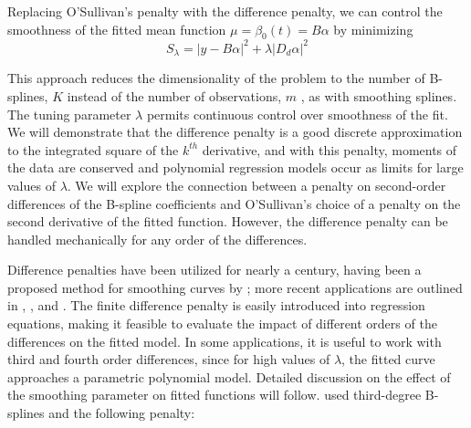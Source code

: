 \documentclass[12pt]{article}
\theoremstyle{definition}
\begin{document}
Replacing O'Sullivan's penalty with the difference penalty, we can control the smoothness of the fitted mean function $\mu = \beta_0\left( t \right) = B\alpha$ by minimizing
\begin{equation*} 
S_\lambda = \vert y- B \alpha \vert^2 + \lambda\vert D_d\alpha \vert^2
\end{equation*}

This approach reduces the dimensionality of the problem to the number of B-splines, $K$ instead of the number of observations, $m$ , as with smoothing splines. The tuning parameter $\lambda$ permits continuous control over smoothness of the fit. We will demonstrate that the difference penalty is a good discrete approximation to the integrated square of the $k^{th}$ derivative, and with this penalty, moments of the data are conserved and polynomial regression models occur as limits for large values of $\lambda$. We will explore the connection between a penalty on second-order differences of the B-spline coefficients and O'Sullivan's choice of a penalty on the second derivative of the fitted function. However, the difference penalty can be handled mechanically for any order of the differences.

Difference penalties have been utilized for nearly a century, having been a proposed method for smoothing curves by \cite{whittaker1922new}; more recent applications are outlined in  \cite{eilers1991penalized}, \cite{eilers1991nonparametric}, and \cite{eilers1995indirect}. The finite difference penalty is easily introduced into regression equations, making it feasible to evaluate the impact of different orders of the differences on the fitted model. In some applications, it is useful to work with third and fourth order differences, since for high values of $\lambda$, the fitted curve approaches a parametric polynomial model. Detailed discussion on the effect of the smoothing parameter on fitted functions will follow. \cite{o1986statistical} used third-degree B-splines and the following penalty:
\end{document}
